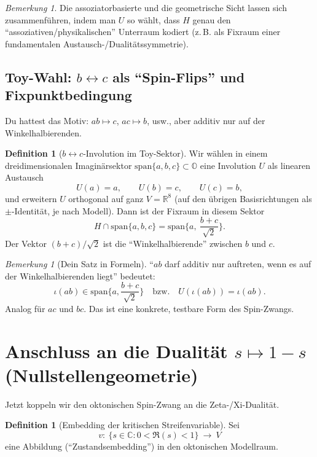\documentclass[11pt,a4paper]{article}
\theoremstyle{definition}
\newtheorem{definition}[satz]{Definition}
\theoremstyle{remark}
\newtheorem{bemerkung}[satz]{Bemerkung}
\begin{document}
	\begin{bemerkung}
		Die assoziatorbasierte und die geometrische Sicht lassen sich zusammenführen, indem man
		$U$ so wählt, dass $H$ genau den ``assoziativen/physikalischen'' Unterraum kodiert
		(z.\,B. als Fixraum einer fundamentalen Austausch-/Dualitätssymmetrie).
	\end{bemerkung}
	
	\subsection{Toy-Wahl: $b\leftrightarrow c$ als ``Spin-Flips'' und Fixpunktbedingung}
	Du hattest das Motiv: $ab\mapsto c$, $ac\mapsto b$, usw., aber additiv nur auf der
	Winkelhalbierenden.
	
	\begin{definition}[$b\leftrightarrow c$-Involution im Toy-Sektor]
		Wir wählen in einem dreidimensionalen Imaginärsektor $\mathrm{span}\{a,b,c\}\subset \mathbb O$
		eine Involution $U$ als linearen Austausch
		\[
		U(a)=a,\qquad U(b)=c,\qquad U(c)=b,
		\]
		und erweitern $U$ orthogonal auf ganz $V=\mathbb R^8$ (auf den übrigen Basisrichtungen
		als $\pm$-Identität, je nach Modell).
		Dann ist der Fixraum in diesem Sektor
		\[
		H\cap \mathrm{span}\{a,b,c\}=\mathrm{span}\Big\{a,\ \frac{b+c}{\sqrt2}\Big\}.
		\]
		Der Vektor $(b+c)/\sqrt2$ ist die ``Winkelhalbierende'' zwischen $b$ und $c$.
	\end{definition}
	
	\begin{bemerkung}[Dein Satz in Formeln]
		``$ab$ darf additiv nur auftreten, wenn es auf der Winkelhalbierenden liegt'' bedeutet:
		\[
		\iota(ab)\in \mathrm{span}\Big\{a,\frac{b+c}{\sqrt2}\Big\}
		\quad\text{bzw.}\quad
		U(\iota(ab))=\iota(ab).
		\]
		Analog für $ac$ und $bc$.
		Das ist eine konkrete, testbare Form des Spin-Zwangs.
	\end{bemerkung}
	
	\section{Anschluss an die Dualität $s\mapsto 1-s$ (Nullstellengeometrie)}
	Jetzt koppeln wir den oktonischen Spin-Zwang an die Zeta-/Xi-Dualität.
	
	\begin{definition}[Embedding der kritischen Streifenvariable]
		Sei
		\[
		v:\ \{s\in\mathbb C:0<\Re(s)<1\}\ \to\ V
		\]
		eine Abbildung (``Zustandsembedding'') in den oktonischen Modellraum.
	\end{definition}
	
\end{document}
